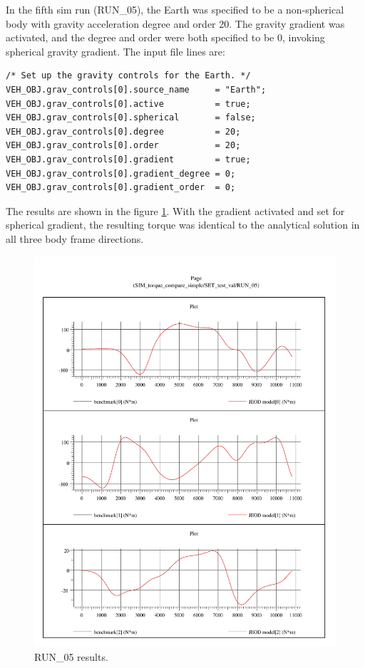 In the fifth sim run (RUN\_05), the Earth was specified to be a
non-spherical body with gravity acceleration degree and order 20.
The gravity gradient was activated, and the degree and order were
both specified to be 0, invoking spherical gravity gradient. 
The input file lines are:
\begin{verbatim}
/* Set up the gravity controls for the Earth. */
VEH_OBJ.grav_controls[0].source_name     = "Earth";
VEH_OBJ.grav_controls[0].active          = true;
VEH_OBJ.grav_controls[0].spherical       = false;
VEH_OBJ.grav_controls[0].degree          = 20;
VEH_OBJ.grav_controls[0].order           = 20;
VEH_OBJ.grav_controls[0].gradient        = true;
VEH_OBJ.grav_controls[0].gradient_degree = 0;
VEH_OBJ.grav_controls[0].gradient_order  = 0;
\end{verbatim}
The results are shown in the figure \ref{fig:run05_results}.
With the gradient activated and set for spherical gradient, 
the resulting torque was identical to the analytical
solution in all three body frame directions.
\begin{figure}[h!]
\centering
\includegraphics[width=6.1in]{figs/run_05.pdf}
\caption{RUN\_05 results.}
\label{fig:run05_results}
\end{figure}
\newpage

